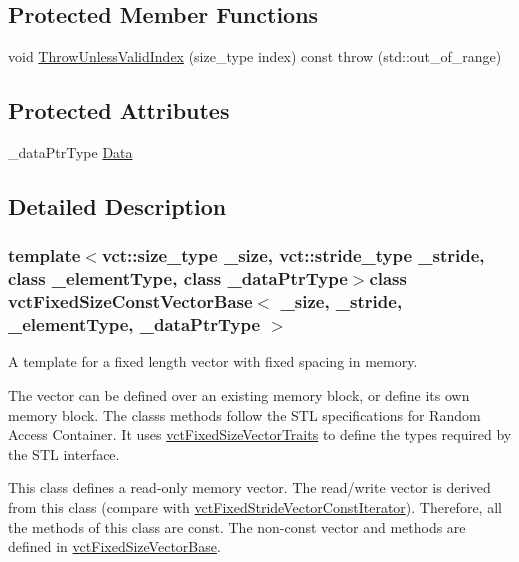 \subsection*{Protected Member Functions}
\begin{DoxyCompactItemize}
\item 
void \hyperlink{classvct_fixed_size_const_vector_base_a3fb1938773c324fbb7c33c0304050dd8}{Throw\+Unless\+Valid\+Index} (size\+\_\+type index) const   throw (std\+::out\+\_\+of\+\_\+range)
\end{DoxyCompactItemize}
\subsection*{Protected Attributes}
\begin{DoxyCompactItemize}
\item 
\+\_\+data\+Ptr\+Type \hyperlink{classvct_fixed_size_const_vector_base_ad5bab7d48e82872547b8838ef74980ee}{Data}
\end{DoxyCompactItemize}


\subsection{Detailed Description}
\subsubsection*{template$<$vct\+::size\+\_\+type \+\_\+size, vct\+::stride\+\_\+type \+\_\+stride, class \+\_\+element\+Type, class \+\_\+data\+Ptr\+Type$>$class vct\+Fixed\+Size\+Const\+Vector\+Base$<$ \+\_\+size, \+\_\+stride, \+\_\+element\+Type, \+\_\+data\+Ptr\+Type $>$}

A template for a fixed length vector with fixed spacing in memory. 

The vector can be defined over an existing memory block, or define its own memory block. The class\textquotesingle{}s methods follow the S\+T\+L specifications for Random Access Container. It uses \hyperlink{classvct_fixed_size_vector_traits}{vct\+Fixed\+Size\+Vector\+Traits} to define the types required by the S\+T\+L interface.

This class defines a read-\/only memory vector. The read/write vector is derived from this class (compare with \hyperlink{classvct_fixed_stride_vector_const_iterator}{vct\+Fixed\+Stride\+Vector\+Const\+Iterator}). Therefore, all the methods of this class are const. The non-\/const vector and methods are defined in \hyperlink{classvct_fixed_size_vector_base}{vct\+Fixed\+Size\+Vector\+Base}.

